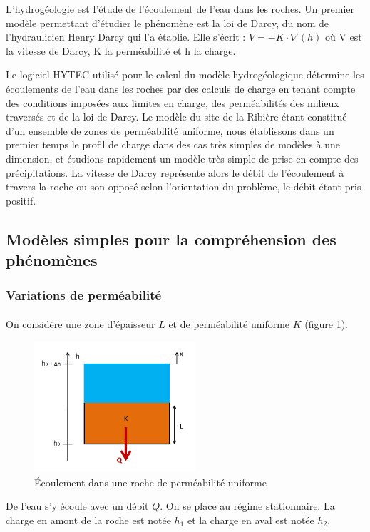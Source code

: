 \documentclass{article}
\begin{document}
L’hydrogéologie est l’étude de l’écoulement de l’eau dans les roches. Un premier modèle permettant d’étudier le phénomène est la loi de Darcy, du nom de l’hydraulicien Henry Darcy qui l’a établie. Elle s’écrit : $V = - K\cdot \nabla(h)$ où V est la vitesse de Darcy, K la perméabilité et h la charge. %

Le logiciel HYTEC utilisé pour le calcul du modèle hydrogéologique détermine les écoulements de l’eau dans les roches par des calculs de charge en tenant compte des conditions imposées aux limites en charge, des perméabilités des milieux traversés et de la loi de Darcy. Le modèle du site de la Ribière étant constitué d’un ensemble de zones de perméabilité uniforme, nous établissons dans un premier temps le profil de charge dans des cas très simples de modèles à une dimension, et étudions rapidement un modèle très simple de prise en compte des précipitations. La vitesse de Darcy représente alors le débit de l’écoulement à travers la roche ou son opposé selon l'orientation du problème, le débit étant pris positif.

\subsection{Modèles simples pour la compréhension des phénomènes}
\subsubsection{Variations de perméabilité}
\paragraph{} On considère une zone d’épaisseur $L$ et de perméabilité uniforme $K$ (figure \ref{fig:ecoulement_permea_uniforme}).

\begin{figure}[H]
    \centering
    \includegraphics[width=6cm]{A_III_B_1.png}
    \caption{Écoulement dans une roche de perméabilité uniforme}
    \label{fig:ecoulement_permea_uniforme}
\end{figure}
De l’eau s’y écoule avec un débit $Q$. On se place au régime stationnaire. La charge en amont de la roche est notée $h_1$ et la charge en aval est notée $h_2$.
\end{document}
